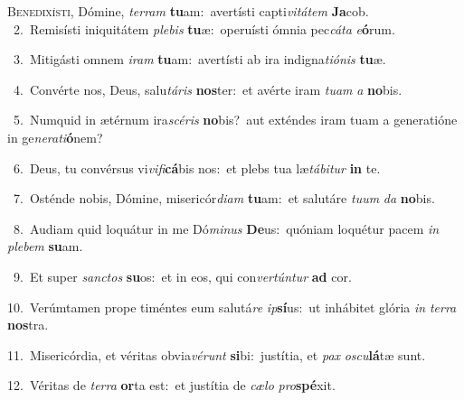 \lettrine{\initial\textcolor{\initialcolor}{B}}{enedixísti,} Dómine, \textit{ter}\-\textit{ram} \textbf{tu}\-am:~\star avertísti capti\-\textit{vi}\-\textit{tá}\textit{tem} \textbf{Ja}\-cob.\\
{\numbfont\textcolor{\numbcolor}{~2.}}~Remisísti iniquitátem \textit{ple}\-\textit{bis} \textbf{tu}\-æ:~\star operuísti ómnia pec\-\textit{cá}\-\textit{ta} \textit{e}\-\textbf{ó}rum.\par
{\numbfont\textcolor{\numbcolor}{~3.}}~Mitigásti omnem \textit{i}\-\textit{ram} \textbf{tu}\-am:~\star avertísti ab ira indigna\-\textit{ti}\-\textit{ó}\textit{nis} \textbf{tu}\-æ.\par
{\numbfont\textcolor{\numbcolor}{~4.}}~Convérte nos, Deus, salu\-\textit{tá}\-\textit{ris} \textbf{nos}\-ter:~\star et avérte iram \textit{tu}\-\textit{am} \textit{a} \textbf{no}\-bis.\par
{\numbfont\textcolor{\numbcolor}{~5.}}~Numquid in ætérnum ira\-\textit{scé}\-\textit{ris} \textbf{no}\-bis?~\star aut exténdes iram tuam a generatióne in ge\-\textit{ne}\-\textit{ra}\textit{ti}\textbf{ó}nem?\par
{\numbfont\textcolor{\numbcolor}{~6.}}~Deus, tu convérsus vi\-\textit{vi}\-\textit{fi}\textbf{cá}bis nos:~\star et plebs tua læ\-\textit{tá}\-\textit{bi}\textit{tur} \textbf{in} te.\par
{\numbfont\textcolor{\numbcolor}{~7.}}~Osténde nobis, Dómine, misericór\-\textit{di}\-\textit{am} \textbf{tu}\-am:~\star et salutáre \textit{tu}\-\textit{um} \textit{da} \textbf{no}\-bis.\par
{\numbfont\textcolor{\numbcolor}{~8.}}~Audiam quid loquátur in me Dó\-\textit{mi}\-\textit{nus} \textbf{De}\-us:~\star quóniam loquétur pacem \textit{in} \textit{ple}\-\textit{bem} \textbf{su}\-am.\par
{\numbfont\textcolor{\numbcolor}{~9.}}~Et super \textit{sanc}\-\textit{tos} \textbf{su}\-os:~\star et in eos, qui con\-\textit{ver}\-\textit{tún}\textit{tur} \textbf{ad} cor.\par
{\numbfont\textcolor{\numbcolor}{10.}}~Verúmtamen prope timéntes eum salutá\textit{re} \textit{ip}\-\textbf{sí}us:~\star ut inhábitet glória \textit{in} \textit{ter}\-\textit{ra} \textbf{nos}\-tra.\par
{\numbfont\textcolor{\numbcolor}{11.}}~Misericórdia, et véritas obvia\-\textit{vé}\-\textit{runt} \textbf{si}\-bi:~\star justítia, et \textit{pax} \textit{os}\-\textit{cu}\textbf{lá}tæ sunt.\par
{\numbfont\textcolor{\numbcolor}{12.}}~Véritas de \textit{ter}\-\textit{ra} \textbf{or}\-ta est:~\star et justítia de \textit{cæ}\-\textit{lo} \textit{pro}\-\textbf{spé}xit.\par
